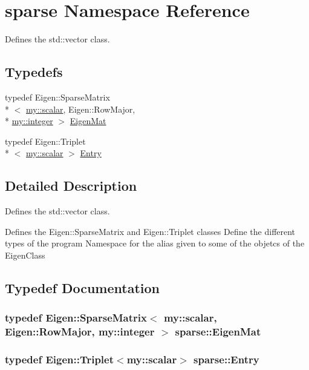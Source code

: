 \hypertarget{namespacesparse}{\section{sparse Namespace Reference}
\label{namespacesparse}
}


Defines the std\+::vector class.  


\subsection*{Typedefs}
\begin{DoxyCompactItemize}
\item 
typedef Eigen\+::\+Sparse\+Matrix\\*
$<$ \hyperlink{namespacemy_a12d9dde7e2fb58fbd11051705c382a86}{my\+::scalar}, Eigen\+::\+Row\+Major, \\*
\hyperlink{namespacemy_a42365393c537edae1e89d20ff90d1923}{my\+::integer} $>$ \hyperlink{namespacesparse_af3fe1ceb08995f6d08e5f96fbbe021bf}{Eigen\+Mat}
\item 
typedef Eigen\+::\+Triplet\\*
$<$ \hyperlink{namespacemy_a12d9dde7e2fb58fbd11051705c382a86}{my\+::scalar} $>$ \hyperlink{namespacesparse_a841919761b2e35cc4d59f636ab10a07b}{Entry}
\end{DoxyCompactItemize}


\subsection{Detailed Description}
Defines the std\+::vector class. 

Defines the Eigen\+::\+Sparse\+Matrix and Eigen\+::\+Triplet classes Define the different types of the program Namespace for the alias given to some of the objetcs of the Eigen\+Class 

\subsection{Typedef Documentation}
\hypertarget{namespacesparse_af3fe1ceb08995f6d08e5f96fbbe021bf}{
\subsubsection[{Eigen\+Mat}]{\setlength{\rightskip}{0pt plus 5cm}typedef Eigen\+::\+Sparse\+Matrix$<$ {\bf my\+::scalar}, Eigen\+::\+Row\+Major, {\bf my\+::integer} $>$ {\bf sparse\+::\+Eigen\+Mat}}}\label{namespacesparse_af3fe1ceb08995f6d08e5f96fbbe021bf}
\hypertarget{namespacesparse_a841919761b2e35cc4d59f636ab10a07b}{
\subsubsection[{Entry}]{\setlength{\rightskip}{0pt plus 5cm}typedef Eigen\+::\+Triplet$<${\bf my\+::scalar}$>$ {\bf sparse\+::\+Entry}}}\label{namespacesparse_a841919761b2e35cc4d59f636ab10a07b}
